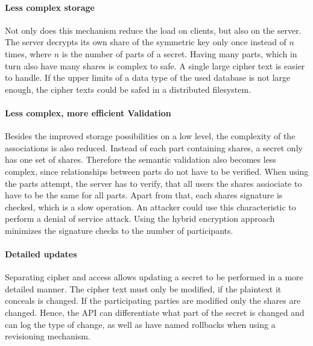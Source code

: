 \paragraph{Less complex storage}{ Not only does this mechanism reduce the load
  on clients, but also on the server. The server decrypts its own share of the
  symmetric key only once instead of $n$ times, where $n$ is the number of
  parts of a secret.  Having many parts, which in turn also have many shares is
complex to safe. A single large cipher text is easier to handle. If the upper
limits of a data type of the used database is not large enough, the cipher
texts could be safed in a distributed filesystem.}

\paragraph{Less complex, more efficient Validation}{ Besides the improved
  storage possibilities on a low level, the complexity of the associations is
  also reduced. Instead of each part containing shares, a secret only has one
  set of shares.  Therefore the semantic validation also becomes less complex,
  since relationships between parts do not have to be verified. When using the
  parts attempt, the server has to verify, that all users the shares assiociate
  to have to be the same for all parts. Apart from that, each shares signature
  is checked, which is a slow operation. An attacker could use this
characteristic to perform a denial of service attack. Using the hybrid
encryption approach minimizes the signature checks to the number of
participants. }

\paragraph{Detailed updates}{ Separating cipher and access allows updating a
  secret to be performed in a more detailed manner. The cipher text must only
  be modified, if the plaintext it conceals is changed. If the participating
  parties are modified only the shares are changed. Hence, the API can
differentiate what part of the secret is changed and can log the type of
change, as well as have named rollbacks when using a revisioning mechanism. }
